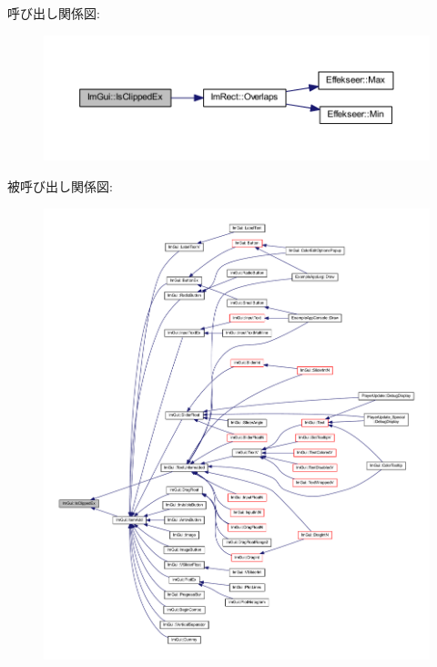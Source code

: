 呼び出し関係図\+:\nopagebreak
\begin{figure}[H]
\begin{center}
\leavevmode
\includegraphics[width=350pt]{namespace_im_gui_a8674467ae34d04bc99df1f7f98f47407_cgraph}
\end{center}
\end{figure}
被呼び出し関係図\+:\nopagebreak
\begin{figure}[H]
\begin{center}
\leavevmode
\includegraphics[width=350pt]{namespace_im_gui_a8674467ae34d04bc99df1f7f98f47407_icgraph}
\end{center}
\end{figure}
\mbox{\label{namespace_im_gui_a2d8ac4569456a8003e4dddd39caf771c}} 
